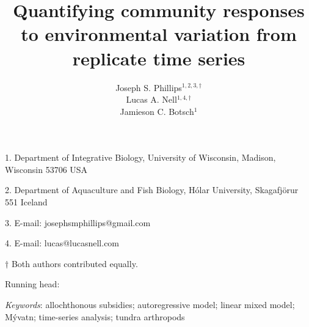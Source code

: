 \documentclass[12pt]{article}
\title{Quantifying community responses to environmental variation from replicate
time series}
\author{
Joseph S. Phillips$^{1,2,3,\dagger}$ \\
Lucas A. Nell$^{1,4,\dagger}$ \\
Jamieson C. Botsch$^{1}$}
\date{}
\begin{document}
\raggedright
\setlength\parindent{0.25in}

\maketitle


\noindent{} 1. Department of Integrative Biology, University of Wisconsin, Madison, Wisconsin 53706 USA

\noindent{} 2. Department of Aquaculture and Fish Biology, H\'{o}lar University, Skagafj\"{o}r{\dh}ur 551 Iceland

\noindent{} 3. E-mail: josephsmphillips@gmail.com

\noindent{} 4. E-mail: lucas@lucasnell.com

\noindent{} $\dagger$ Both authors contributed equally.



\bigskip

Running head: {

}


\linenumbers{}

\clearpage




\bigskip

\textit{Keywords}: {allochthonous subsidies; autoregressive model; linear mixed model;
M\'{y}vatn; time-series analysis; tundra arthropods
}







\end{document}
